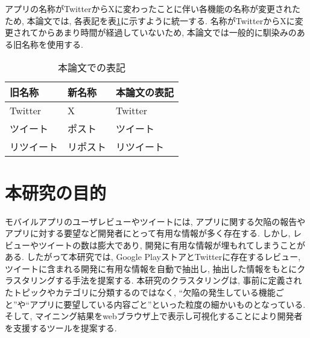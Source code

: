 アプリの名称がTwitterからXに変わったことに伴い各機能の名称が変更されたため, 本論文では, 各表記を表\ref{tb:twitter}に示すように統一する. 名称がTwitterからXに変更されてからあまり時間が経過していないため, 本論文では一般的に馴染みのある旧名称を使用する. 

\begin{table}[H]
  \caption{本論文での表記}
  \label{tb:twitter}
  \begin{center}
  \begin{tabularx}{\linewidth}{X|X|X}
    \hline
    旧名称&新名称&本論文の表記\\\hline\hline
    Twitter&X&Twitter\\\hline
    ツイート&ポスト&ツイート\\\hline
    リツイート&リポスト&リツイート\\\hline
  \end{tabularx}\end{center}
\end{table}


\section{本研究の目的}

モバイルアプリのユーザレビューやツイートには, アプリに関する欠陥の報告やアプリに対する要望など開発者にとって有用な情報が多く存在する. しかし, レビューやツイートの数は膨大であり, 開発に有用な情報が埋もれてしまうことがある. 
したがって本研究では, Google PlayストアとTwitterに存在するレビュー, ツイートに含まれる開発に有用な情報を自動で抽出し, 抽出した情報をもとにクラスタリングする手法を提案する. 本研究のクラスタリングは, 事前に定義されたトピックやカテゴリに分類するのではなく, ``欠陥の発生している機能ごと''や``アプリに要望している内容ごと''といった粒度の細かいものとなっている. 
そして, マイニング結果をwebブラウザ上で表示し可視化することにより開発者を支援するツールを提案する. 


